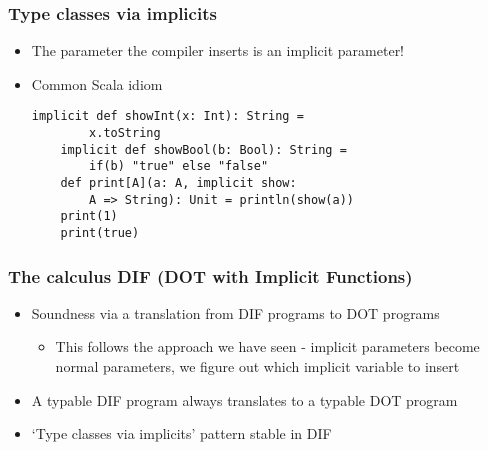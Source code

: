 \begin{frame}[fragile]
    \frametitle{Type classes via implicits}
    \begin{itemize}
        \pause
        \item The parameter the compiler inserts is an implicit parameter!
        \pause
        \item Common Scala idiom
        \pause
        \begin{lstlisting}[mathescape]
    implicit def showInt(x: Int): String =
        x.toString
    implicit def showBool(b: Bool): String =
        if(b) "true" else "false"
    def print[A](a: A, implicit show:
        A => String): Unit = println(show(a))
    print(1)
    print(true)
        \end{lstlisting}
    \end{itemize}
\end{frame}

\begin{frame}
\end{frame}

\begin{frame}
    \frametitle{The calculus DIF (DOT with Implicit Functions)}
    \begin{itemize}
        \pause \item Soundness via a translation from DIF programs to DOT
            programs
        \begin{itemize}
            \pause \item This follows the approach we have seen - implicit
                parameters become normal parameters, we figure out which
                implicit variable to insert
        \end{itemize}
        \pause \item A typable DIF program always translates to a typable DOT
            program
        \pause \item `Type classes via implicits' pattern stable in DIF
    \end{itemize}
\end{frame}

